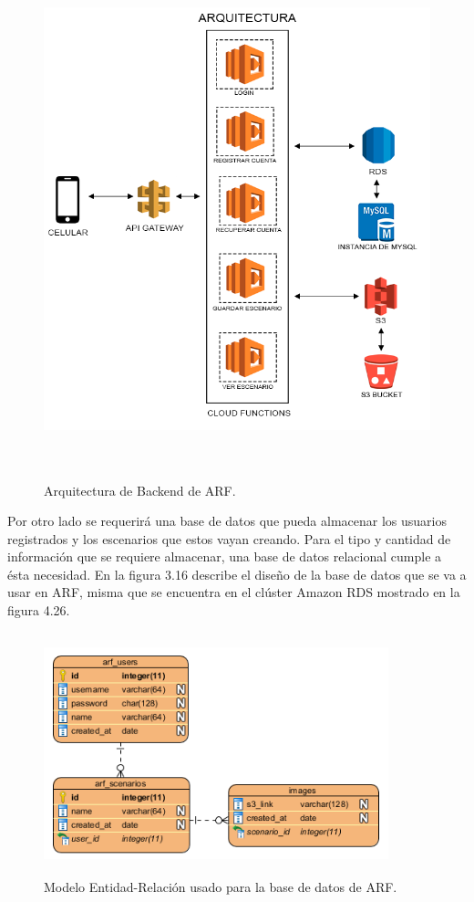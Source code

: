 \begin{figure}[H]
	\centering
	\includegraphics[width=15cm,height=15cm]{imagenes/desarrollo/arquitectura/ArchitecturaBackend.png}
	\caption{Arquitectura de Backend de ARF.}
	\label{fig:arqbackend}
\end{figure}
\par
Por otro lado se requerirá una base de datos que pueda almacenar los usuarios registrados y los escenarios que estos vayan creando. Para el tipo y cantidad de información que se requiere almacenar, una base de datos relacional cumple a ésta necesidad. En la figura  3.16 describe el diseño de la base de datos que se va a usar en ARF, misma que se encuentra en el clúster Amazon RDS mostrado en la figura 4.26.
\begin{figure}[H]
	\centering
	\includegraphics[width=10cm,height=7cm]{imagenes/desarrollo/arquitectura/ERD.png}
	\caption{Modelo Entidad-Relación usado para la base de datos de ARF.}
	\label{fig:arqbackend}
\end{figure}